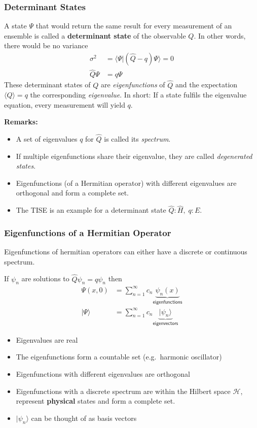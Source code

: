 \subsubsection{Determinant States}
A state $\Psi$ that would return the same result for every measurement of an ensemble is called a \textbf{determinant state} of the observable $Q$.
In other words, there would be no variance
\noindent\begin{align*}
    \sigma^2     & = \langle \Psi|(\hat{Q} - q) \Psi\rangle = 0 \\
    \hat{Q} \Psi & = q \Psi
\end{align*}
These determinant states of $Q$ are \textit{eigenfunctions} of $\hat{Q}$ and the expectation $\langle Q\rangle = q$ the corresponding \textit{eigenvalue}.
\newpar{}
In short: If a state fulfils the eigenvalue equation, every measurement will yield $q$.

\textbf{Remarks:}
\begin{itemize}
    \item A set of eigenvalues $q$ for $\hat{Q}$ is called its \textit{spectrum}.
    \item If multiple eigenfunctions share their eigenvalue, they are called \textit{degenerated states}.
    \item Eigenfunctions (of a Hermitian operator) with different eigenvalues are orthogonal and form a complete set.
    \item The TISE is an example for a determinant state\newline
          $\hat{Q}: \hat{H},\; q:E$.
\end{itemize}

\subsubsection{Eigenfunctions of a Hermitian Operator}
Eigenfunctions of hermitian operators can either have a discrete or continuous spectrum.

\newpar{}

If $\psi_n$ are solutions to $\hat{Q}\psi_n=q\psi_n$ then
\noindent\begin{align*}
    \Psi(x,0)    & = \sum_{n=1}^{\infty} c_n \underbrace{\psi_n(x)}_{\textsf{eigenfunctions}}    \\
    |\Psi\rangle & = \sum_{n=1}^{\infty} c_n \underbrace{|\psi_n\rangle}_{\textsf{eigenvectors}}
\end{align*}

\begin{itemize}
    \item Eigenvalues are real
    \item The eigenfunctions form a countable set (e.g.\ harmonic oscillator)
    \item Eigenfunctions with different eigenvalues are orthogonal
    \item Eigenfunctions with a discrete spectrum are within the Hilbert space $\mathcal{H}$, represent \textbf{physical} states and form a complete set.
    \item $|\psi_n\rangle$ can be thought of as basis vectors
\end{itemize}

